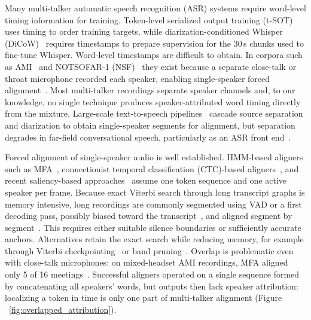 Many multi-talker automatic speech recognition (ASR) systems require word-level timing information for training. Token-level serialized output training (t-SOT)~\cite{kanda22_interspeech} uses timing to order training targets, while diarization-conditioned Whisper (DiCoW)~\cite{polok2026dicow} requires timestamps to prepare supervision for the 30\,s chunks used to fine-tune Whisper. Word-level timestamps are difficult to obtain. In corpora such as AMI~\cite{carletta2005ami} and NOTSOFAR-1 (NSF)~\cite{vinnikov2024notsofar} they exist because a separate close-talk or throat microphone recorded each speaker, enabling single-speaker forced alignment~\cite{mcauliffe2017montreal}. Most multi-talker recordings separate speaker channels and, to our knowledge, no single technique produces speaker-attributed word timing directly from the mixture. Large-scale text-to-speech pipelines~\cite{he2024emilia, jung2026sommelier} cascade source separation and diarization to obtain single-speaker segments for alignment, but separation degrades in far-field conversational speech, particularly as an ASR front end~\cite{cornell2025recent}.

Forced alignment of single-speaker audio is well established. HMM-based aligners such as MFA~\cite{mcauliffe2017montreal, povey2011kaldi}, connectionist temporal classification (CTC)-based aligners~\cite{huang2024less, rastorgueva2023nfa, bain2023whisperx},
and recent saliency-based approaches~\cite{zeyer2026gradient} assume one token sequence and one active speaker per frame. Because exact Viterbi search through long transcript graphs is memory intensive, long recordings are commonly segmented using VAD or a first decoding pass, possibly biased toward the transcript~\cite{ manohar2017jhu}, and aligned segment by segment~\cite{moreno1998recursive, katsamanis2011sailalign}. This requires either suitable silence boundaries or sufficiently accurate anchors. Alternatives retain the exact search while reducing memory, for example through Viterbi checkpointing~\cite{grice1997reduced} or band pruning~\cite{kuang2022pruned}. Overlap is problematic even with close-talk microphones: on mixed-headset AMI recordings, MFA aligned only 5 of 16 meetings~\cite{rastorgueva2023nfa}. Successful aligners operated on a single sequence formed by concatenating all speakers' words, but outputs then lack speaker attribution: localizing a token in time is only one part of multi-talker alignment (Figure ~\ref{fig:overlapped_attribution}).

